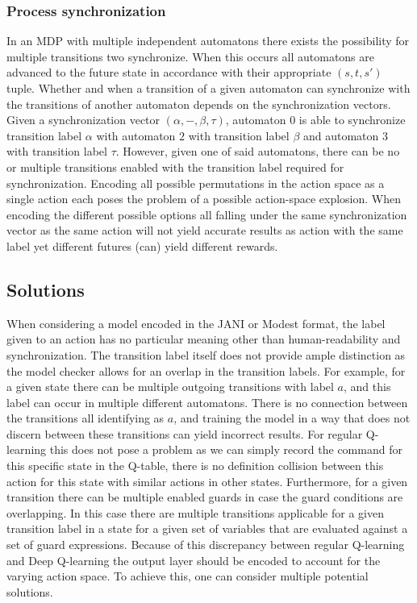 \subsubsection{Process synchronization}
In an MDP with multiple independent automatons there exists the possibility for multiple transitions two synchronize. When this occurs all automatons are advanced to the future state in accordance with their appropriate $(s, t, s')$ tuple. Whether and when a transition of a given automaton can synchronize with the transitions of another automaton depends on the synchronization vectors. Given a synchronization vector $(\alpha, -, \beta, \tau)$, automaton $0$ is able to synchronize transition label $\alpha$ with automaton $2$ with transition label $\beta$ and automaton $3$ with transition label $\tau$. However, given one of said automatons, there can be no or multiple transitions enabled with the transition label required for synchronization. Encoding all possible permutations in the action space as a single action each poses the problem of a possible action-space explosion. When encoding the different possible options all falling under the same synchronization vector as the same action will not yield accurate results as action with the same label yet different futures (can) yield different rewards.

\subsection{Solutions}
When considering a model encoded in the JANI\cite{jani} or Modest\cite{modest} format, the label given to an action has no particular meaning other than human-readability and synchronization. The transition label itself does not provide ample distinction as the model checker allows for an overlap in the transition labels. For example, for a given state there can be multiple outgoing transitions with label $a$, and this label can occur in multiple different automatons. There is no connection between the transitions all identifying as $a$, and training the model in a way that does not discern between these transitions can yield incorrect results. For regular Q-learning this does not pose a problem as we can simply record the command for this specific state in the Q-table, there is no definition collision between this action for this state with similar actions in other states. Furthermore, for a given transition there can be multiple enabled guards in case the guard conditions are overlapping. In this case there are multiple transitions applicable for a given transition label in a state for a given set of variables that are evaluated against a set of guard expressions. Because of this discrepancy between regular Q-learning and Deep Q-learning the output layer should be encoded to account for the varying action space. To achieve this, one can consider multiple potential solutions.

